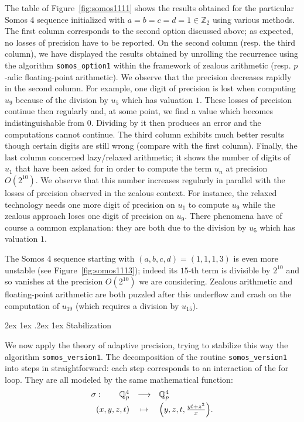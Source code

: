 \documentclass[11pt]{article}
\makeatletter
\numberwithin{equation}{section}
\numberwithin{figure}{section}
\renewcommand\paragraph{\@startsection{paragraph}{4}{\z@}%
                                    {2ex \@plus1ex \@minus.2ex}%
                                    {1ex}%
                                    {\normalfont\normalsize\bfseries}}
\theoremstyle{definition}
\newcommand{\Z}{\mathbb Z}
\newcommand{\Q}{\mathbb Q}
\newcommand{\Qp}{\Q_p}
\makeatother
\begin{document}
The table of Figure~\ref{fig:somos1111} shows the results obtained for 
the particular Somos 4 sequence initialized with $a = b = c = d = 1 \in 
\Z_2$ using various methods. The first column corresponds to the second 
option discussed above; as expected, no losses of precision have to be 
reported. On the second column (resp. the third column), we have 
displayed the results obtained by unrolling the recurrence using the 
algorithm \texttt{somos\_option1} within the framework of zealous 
arithmetic (resp. $p$-adic floating-point arithmetic). We observe that 
the precision decreases rapidly in the second column. For example, one 
digit of precision is lost when computing $u_9$ because of the division 
by $u_5$ which has valuation $1$. These losses of precision continue 
then regularly and, at some point, we find a value which becomes 
indistinguishable from $0$. Dividing by it then produces an error and 
the computations cannot continue. The third column exhibits much better
results though certain digits are still wrong (compare with the first
column).
Finally, the last column concerned lazy/relaxed arithmetic; it shows the 
number of digits of $u_1$ that have been asked for in order to compute 
the term $u_n$ at precision $O(2^{10})$. We observe that this number
increases regularly in parallel with the losses of precision observed
in the zealous context. For instance, the relaxed technology needs one 
more digit of precision on $u_1$ to compute $u_9$ while the zealous
approach loses one digit of precision on $u_9$. There phenomena have of 
course a common explanation: they are both due to the division by $u_5$ 
which has valuation $1$.

The Somos 4 sequence starting with $(a, b, c, d) = (1,1,1,3)$ is even 
more unstable (see Figure~\ref{fig:somos1113}); indeed its $15$-th term 
is divisible by $2^{10}$ and so vanishes at the precision $O(2^{10})$ we 
are considering. Zealous arithmetic and floating-point arithmetic are 
both puzzled after this underflow and crash on the computation of 
$u_{19}$ (which requires a division by $u_{15}$).

\paragraph{Stabilization}

We now apply the theory of adaptive precision, trying to stabilize 
this way the algorithm \texttt{somos\_version1}. The decomposition of 
the routine \texttt{somos\_version1} into steps in straightforward: each 
step corresponds to an interaction of the for loop. They are all modeled 
by the same mathematical function:
$$\begin{array}{rcl}
\sigma : \qquad \Qp^4 & \longrightarrow & \Qp^4 \smallskip \\
(x,y,z,t) & \mapsto & \Big(y,z,t,\frac{yt+z^2}x\Big).
\end{array}$$
\end{document}
